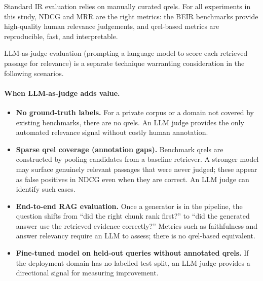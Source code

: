 \documentclass[12pt, a4paper]{article}
\begin{document}
Standard IR evaluation relies on manually curated qrels.  For all experiments
in this study, NDCG and MRR are the right metrics: the BEIR benchmarks provide
high-quality human relevance judgements, and qrel-based metrics are
reproducible, fast, and interpretable.

LLM-as-judge evaluation (prompting a language model to score each retrieved
passage for relevance) is a separate technique warranting consideration in
the following scenarios.

\paragraph{When LLM-as-judge adds value.}
\begin{itemize}
  \item \textbf{No ground-truth labels.}  For a private corpus or a domain
        not covered by existing benchmarks, there are no qrels.  An LLM
        judge provides the only automated relevance signal without costly
        human annotation.
  \item \textbf{Sparse qrel coverage (annotation gaps).}  Benchmark qrels
        are constructed by pooling candidates from a baseline retriever.  A
        stronger model may surface genuinely relevant passages that were never
        judged; these appear as false positives in NDCG even when they are
        correct.  An LLM judge can identify such cases.
  \item \textbf{End-to-end RAG evaluation.}  Once a generator is in the
        pipeline, the question shifts from ``did the right chunk rank first?''
        to ``did the generated answer use the retrieved evidence correctly?''
        Metrics such as faithfulness and answer relevancy require an LLM
        to assess; there is no qrel-based equivalent.
  \item \textbf{Fine-tuned model on held-out queries without annotated qrels.}
        If the deployment domain has no labelled test split, an LLM judge
        provides a directional signal for measuring improvement.
\end{itemize}
\end{document}

